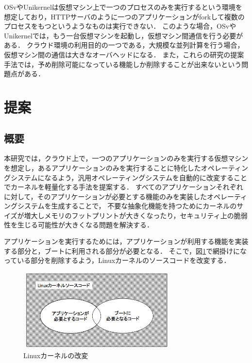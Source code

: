 \documentclass[graduation-thesis]{mlarticle}
\begin{document}
OSvやUnikernelは仮想マシン上で一つのプロセスのみを実行するという環境を想定しており，HTTPサーバのように一つのアプリケーションがforkして複数のプロセスをもつというようなものは実行できない．
このような場合，OSvやUnikernelでは，もう一台仮想マシンを起動し，仮想マシン間通信を行う必要がある．
クラウド環境の利用目的の一つである，大規模な並列計算を行う場合，仮想マシン間の通信は大きなオーバヘッドになる．
また，これらの研究の提案手法では，予め削除可能になっている機能しか削除することが出来ないという問題点がある．

\clearpage
\section{提案}
\label{proposal}

\subsection{概要}
\label{proposal:abstruction}
本研究では，クラウド上で，一つのアプリケーションのみを実行する仮想マシンを想定し，あるアプリケーションのみを実行することに特化したオペレーティングシステムになるよう，汎用オペレーティングシステムを自動的に改変することでカーネルを軽量化する手法を提案する．
すべてのアプリケーションそれぞれに対して，そのアプリケーションが必要とする機能のみを実装したオペレーティングシステムを生成することで，
不要な抽象化機能を持つためにカーネルのサイズが増大しメモリのフットプリントが大きくなったり，セキュリティ上の脆弱性を生じる可能性が大きくなる問題を解決する．

アプリケーションを実行するためには，アプリケーションが利用する機能を実装する部分と，ブートに利用される部分が必要となる．
そこで，図\ref{fig:kernelcode}で網掛けになっている部分を削除するよう，Linuxカーネルのソースコードを改変する．

\begin{figure}[H]
  \begin{center}
    \includegraphics[width=8.0cm]{images/kernelcode.png}
    \caption{Linuxカーネルの改変}
    \label{fig:kernelcode}
  \end{center}
\end{figure}
\end{document}
